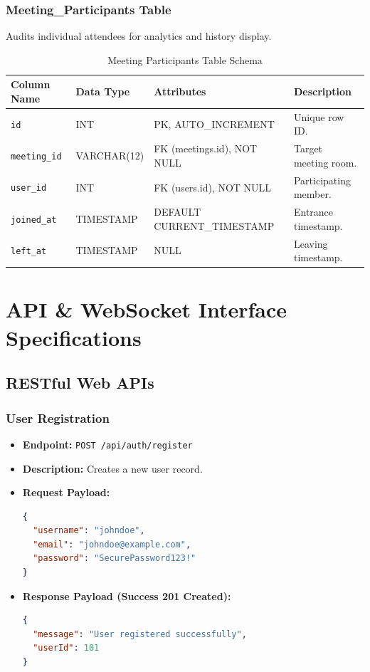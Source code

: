 \documentclass[11pt,a4paper]{article}
\begin{document}
\subsubsection{Meeting\_Participants Table}
Audits individual attendees for analytics and history display.
\begin{table}[h!]
\centering
\begin{tabular}{@{}llll@{}}
\toprule
\textbf{Column Name} & \textbf{Data Type} & \textbf{Attributes} & \textbf{Description} \\ \midrule
\texttt{id} & INT & PK, AUTO\_INCREMENT & Unique row ID. \\
\texttt{meeting\_id} & VARCHAR(12) & FK (meetings.id), NOT NULL & Target meeting room. \\
\texttt{user\_id} & INT & FK (users.id), NOT NULL & Participating member. \\
\texttt{joined\_at} & TIMESTAMP & DEFAULT CURRENT\_TIMESTAMP & Entrance timestamp. \\
\texttt{left\_at} & TIMESTAMP & NULL & Leaving timestamp. \\ \bottomrule
\end{tabular}
\caption{Meeting Participants Table Schema}
\label{tab:participants_table}
\end{table}

\newpage

\section{API \& WebSocket Interface Specifications}

\subsection{RESTful Web APIs}

\subsubsection{User Registration}
\begin{itemize}
    \item \textbf{Endpoint:} \texttt{POST /api/auth/register}
    \item \textbf{Description:} Creates a new user record.
    \item \textbf{Request Payload:}
\begin{lstlisting}[language=json]
{
  "username": "johndoe",
  "email": "johndoe@example.com",
  "password": "SecurePassword123!"
}
\end{lstlisting}
    \item \textbf{Response Payload (Success 201 Created):}
\begin{lstlisting}[language=json]
{
  "message": "User registered successfully",
  "userId": 101
}
\end{lstlisting}
\end{itemize}
\end{document}
